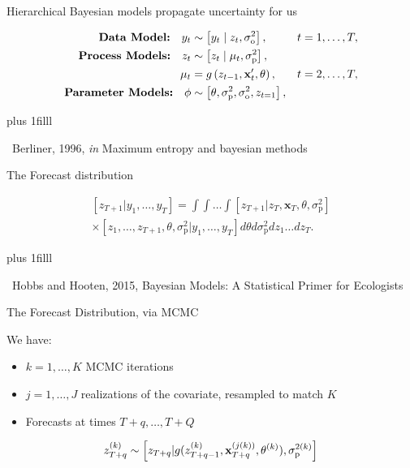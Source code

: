 \documentclass[12pt, compress, aspectratio=1610]{beamer}
\newcommand{\btVFill}{\vskip0pt plus 1filll}
\newcommand{\credit}[1]{\btVFill\par\hfill \footnotesize ~#1}
\begin{document}
\begin{frame}{%
\protect\hypertarget{hierarchical-bayesian-models-propagate-uncertainty-for-us}{%
Hierarchical Bayesian models propagate uncertainty for us}}

\begin{equation*}
\begin{aligned}[b]
\textbf{Data Model:} \quad y_t &\sim \left[y_t \;|\; z_t, \sigma^2_{\text{o}}\right], &t = 1,\dots,T, \\ 
\textbf{Process Models:} \quad z_t &\sim \left[z_t \;|\; \mu_t, \sigma^2_{\text{p}}\right],  \\ 
\mu_t &= g \left(z_{t-1},\textbf{x}'_t, \boldmath{\theta} \right), &t = 2,\dots,T, \\ 
\textbf{Parameter Models:} \quad \boldmath{\phi} &\sim \left[\boldmath{\theta},\sigma^2_{\text{p}},\sigma^2_{\text{o}},z_{t=1} \right],
\end{aligned}
\end{equation*}

\credit{Berliner, 1996, \emph{in} Maximum entropy and bayesian methods}

\end{frame}

\begin{frame}{%
\protect\hypertarget{the-forecast-distribution}{%
The Forecast distribution}}

\begin{equation}
\begin{gathered}
\left[z_{T+1} | y_1,\dots,y_T \right] = \int \int \dots \int \left[z_{T+1} | z_T, \textbf{x}_T, \theta, \sigma^2_{\text{p}} \right] \\ \times \left[z_1,\dots,z_{T+1},\theta, \sigma^2_{\text{p}} | y_1,\dots,y_T \right] d \theta d \sigma^2_{\text{p}} d z_1 \dots d z_T.
\end{gathered}
\end{equation}

\credit{Hobbs and Hooten, 2015, Bayesian Models: A Statistical Primer for Ecologists}

\end{frame}

\begin{frame}{%
\protect\hypertarget{the-forecast-distribution-via-mcmc}{%
The Forecast Distribution, via MCMC}}

We have:

\begin{itemize}
 \item $k = 1,\dots,K$ MCMC iterations
 \item $j = 1,\dots,J$ realizations of the covariate, resampled to match $K$
 \item Forecasts at times $T+q,\dots,T+Q$
\end{itemize}

\begin{equation*}
z_{T+q}^{(k)} \sim \left[z_{T+q} | g(z_{T+q-1}^{(k)}, \textbf{x}_{T+q}^{(j(k))},\boldmath{\theta}^{(k)}), \sigma^{2(k)}_{\text{p}} \right]
\end{equation*}

\end{frame}
\end{document}
